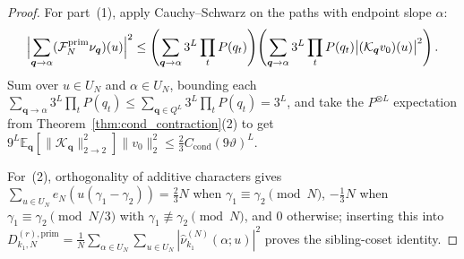 \documentclass[11pt,a4paper]{article}
\numberwithin{equation}{section}
\theoremstyle{definition}
\theoremstyle{remark}
\newcommand{\E}{\mathbb{E}}
\newcommand{\cF}{\mathcal{F}}
\newcommand{\cK}{\mathcal{K}}
\newcommand{\prim}{\mathrm{prim}}
\begin{document}
\begin{proof}
For part~(1), apply Cauchy--Schwarz on the paths with endpoint slope $\alpha$:
\[
\Bigl|\sum_{\boldsymbol{q}\to\alpha} (\cF_N^{\prim}\nu_{\boldsymbol{q}})(u)\Bigr|^2
\le \left(\sum_{\boldsymbol{q}\to\alpha} 3^L\prod_t P(q_t)\right)\!\left(\sum_{\boldsymbol{q}\to\alpha} 3^L\prod_t P(q_t)\bigl|(\cK_{\boldsymbol{q}}v_0)(u)\bigr|^2\right).
\]
Sum over $u \in U_N$ and $\alpha \in U_N$, bounding each $\sum_{\boldsymbol{q}\to\alpha} 3^L\prod_t P(q_t) \le \sum_{\boldsymbol{q}\in Q^L} 3^L\prod_t P(q_t) = 3^L$, and take the $P^{\otimes L}$ expectation from Theorem~\ref{thm:cond_contraction}(2) to get $9^L \E_{\boldsymbol{q}}[\|\cK_{\boldsymbol{q}}\|_{2\to 2}^2] \|v_0\|_2^2 \le \frac{2}{3} C_{\mathrm{cond}} (9\vartheta)^L$.

For~(2), orthogonality of additive characters gives $\sum_{u \in U_N} e_N(u(\gamma_1 - \gamma_2)) = \frac{2}{3}N$ when $\gamma_1 \equiv \gamma_2 \pmod N$, $-\frac{1}{3}N$ when $\gamma_1 \equiv \gamma_2 \pmod{N/3}$ with $\gamma_1 \not\equiv \gamma_2 \pmod N$, and $0$ otherwise; inserting this into $D_{k_1, N}^{(r), \prim} = \frac{1}{N}\sum_{\alpha \in U_N}\sum_{u \in U_N} |\widehat{\nu}_{k_1}^{(N)}(\alpha; u)|^2$ proves the sibling-coset identity.


\end{proof}
\end{document}
